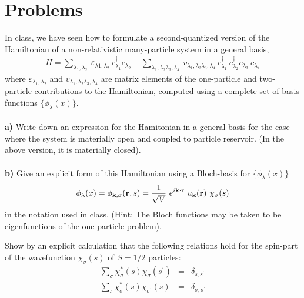 \section*{Problems}

\begin{problem}
	In class, we have seen how to formulate a second-quantized version of the Hamiltonian of a non-relativistic many-particle system in a general basis,
	\begin{eqnarray}
		H = \sum_{\lambda_1,\lambda_2} ~ \varepsilon_{\lambda1,\lambda_2}~ c^{\dagger}_{\lambda_1}  c_{\lambda_2} 
		+ \sum_{\lambda_1,\lambda_2\lambda_3,\lambda_4}
		~v_{\lambda_1,\lambda_2\lambda_3,\lambda_4}~
		c^{\dagger}_{\lambda_1} ~ c^{\dagger}_{\lambda_2}  c_{\lambda_3} ~ c_{\lambda_4}  \nonumber
	\end{eqnarray}
	where $\varepsilon_{\lambda_1,\lambda_2}$ and $v_{\lambda_1,\lambda_2\lambda_3,\lambda_4}$ are matrix elements of the one-particle and two-particle contributions to the Hamiltonian, computed using a complete set of basis functions $\{ \phi_{\lambda}(x) \}$.
	\ \\
	\ \\
	{\bf a)} Write down an expression for the Hamitonian in a general basis for the case where the system is materially open and coupled to particle reservoir. (In the above version, it is materially closed).
	\ \\
	\ \\
	{\bf b) } Give an explicit form of this   Hamiltonian using a Bloch-basis for $\{ \phi_{\lambda}(x) \}$
	\begin{eqnarray}
		\phi_{\lambda}(x) = \phi_{{\bf k},\sigma}({\bf r},s)  = \frac{1}{\sqrt{V}} ~e^{i {\bf k} \cdot {\bf r}} ~ u_{\bf k} ({\bf r}) ~ \chi_{\sigma}(s) \nonumber
	\end{eqnarray}
	in the notation used in class. (Hint: The Bloch functions may be taken to be eigenfunctions of the one-particle problem). 
\end{problem}
\begin{problem}
	
	Show by an explicit calculation that the following relations hold for the spin-part of the wavefunction $\chi_\sigma(s)$ of $S=1/2$ particles:
	\begin{eqnarray}
		\sum_{\sigma} \chi^*_\sigma(s)  \chi_\sigma(s^{\prime}) & = & \delta_{s,s^{\prime}} \nonumber \\
		\sum_{s} \chi^*_\sigma(s)  \chi_{\sigma^{\prime}}(s) & = & \delta_{\sigma,\sigma^{\prime}} \nonumber
	\end{eqnarray}
\end{problem}
